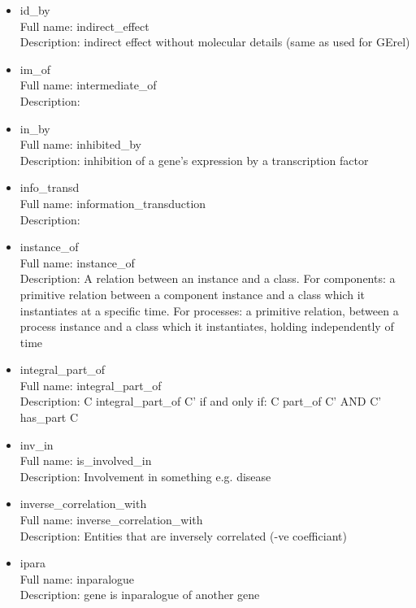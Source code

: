 \begin{itemize}
\item{id\_by}\\ Full name: indirect\_effect\\ Description: indirect effect without molecular details (same as used for GErel) 

\item{im\_of}\\ Full name: intermediate\_of\\ Description: 

\item{in\_by}\\ Full name: inhibited\_by\\ Description: inhibition of a gene's expression by a transcription factor 

\item{info\_transd}\\ Full name: information\_transduction\\ Description: 

\item{instance\_of}\\ Full name: instance\_of\\ Description: A relation between an instance and a class. For components: a primitive relation between a component instance and a class which it instantiates at a specific time. For processes: a primitive relation, between a process instance and a class which it instantiates, holding independently of time 

\item{integral\_part\_of}\\ Full name: integral\_part\_of\\ Description: C integral\_part\_of C' if and only if: C part\_of C' AND C' has\_part C 

\item{inv\_in}\\ Full name: is\_involved\_in\\ Description: Involvement in something e.g. disease 

\item{inverse\_correlation\_with}\\ Full name: inverse\_correlation\_with\\ Description: Entities that are inversely correlated (-ve coefficiant) 

\item{ipara}\\ Full name: inparalogue\\ Description: gene is inparalogue of another gene 


\end{itemize}
